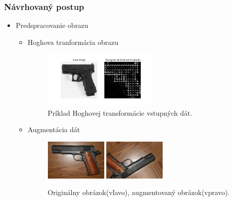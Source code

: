 \documentclass[10pt,xcolor=pdflatex]{beamer}
\begin{document}
\begin{frame}\frametitle{Návrhovaný postup}
    \begin{itemize}
        \item Predspracovanie obrazu
        \begin{itemize}
            \item Hoghova tranformácia obrazu

            \begin{figure}[H]
                \centering
                \includegraphics[width=0.55\textwidth]{img/hog}
                \caption{Príklad Hoghovej transformácie vstupných dát.}
            \end{figure}

            \item Augmentácia dát

            \begin{figure}[H]
                \centering
                \includegraphics[width=0.3\textwidth]{img/weapon}
                \qquad
                \includegraphics[width=0.30\textwidth]{img/weapon-augmented}
                \caption{Originálny obrázok(vľavo), augmentovaný obrázok(vpravo).}
            \end{figure}
        \end{itemize}
    \end{itemize}
\end{frame}
\end{document}
